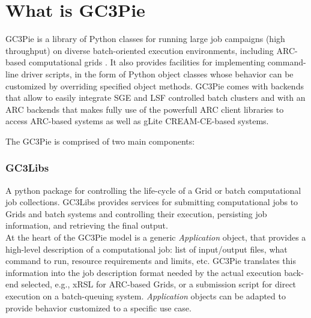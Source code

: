 \documentclass{PoS}
\begin{document}

\section{What is GC3Pie}
GC3Pie is a library of Python classes for running large job campaigns
(high throughput) on diverse batch-oriented execution environments,
including \acs{ARC}-based computational grids \cite{arc}.  It also
provides facilities for implementing command-line driver scripts, in
the form of Python object classes whose behavior can be customized by
overriding specified object methods.
GC3Pie comes with backends that allow to easily integrate SGE and LSF
controlled batch clusters and with an ARC backends that makes fully
use of the powerfull ARC client libraries to access ARC-based systems
as well as gLite \cite{glite} CREAM-CE-based systems.

The GC3Pie is comprised of two main components: 

\subsubsection*{GC3Libs}
 A python package for controlling the life-cycle of a Grid or batch
 computational job collections. GC3Libs provides services for
 submitting computational jobs to Grids and batch systems and
 controlling their execution, persisting job information, and
 retrieving the final output. \\


At the heart of the GC3Pie model is a generic \emph{Application}
object, that provides a high-level description of a computational
job: list of input/output files, what command to run, resource
requirements and limits, etc. GC3Pie translates this information into
the job description format needed by the actual execution back-end
selected, e.g., \acs{xRSL} for ARC-based Grids, or a submission script for
direct execution on a batch-queuing system. \emph{Application} objects
can be adapted to provide behavior customized to a specific use case.
\end{document}
